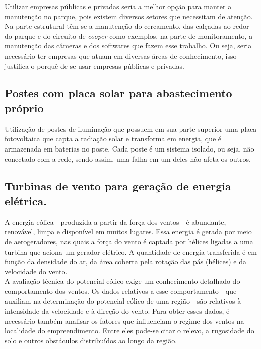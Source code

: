 	Utilizar empresas p\'ublicas e privadas seria a melhor op\c{c}\~ao para manter a manuten\c{c}\~ao no parque, pois existem diversos setores que necessitam de aten\c{c}\~ao. Na parte estrutural t\^em-se a manuten\c{c}\~ao do cercamento, das cal\c{c}adas ao redor do parque e do circuito de \textit{cooper} como exemplos, na parte de monitoramento, a manuten\c{c}\~ao das c\^ameras e dos softwares que fazem esse trabalho. Ou seja, seria necess\'ario ter empresas que atuam em diversas \'areas de conhecimento, isso justifica o porqu\^e de se usar empresas p\'ublicas e privadas.

\subsection{Postes com placa solar para abastecimento pr\'oprio}

Utiliza\c{c}\~ao de postes de ilumina\c{c}\~ao que possuem em sua parte superior uma placa fotovoltaica que capta a radia\c{c}\~ao solar e transforma em energia, que \'e armazenada em baterias no poste. Cada poste \'e um sistema isolado, ou seja, n\~ao conectado com a rede, sendo assim, uma falha em um deles n\~ao afeta os outros.

\subsection{Turbinas de vento para gera\c{c}\~ao de energia el\'etrica.}

A energia e\'olica - produzida a partir da for\c{c}a dos ventos - \'e abundante, renov\'avel, limpa e dispon\'ivel em muitos lugares. Essa energia \'e gerada por meio de aerogeradores, nas quais a for\c{c}a do vento \'e captada por h\'elices ligadas a uma turbina que aciona um gerador el\'etrico. A quantidade de energia transferida \'e em fun\c{c}\~ao da densidade do ar, da \'area coberta pela rota\c{c}\~ao das p\'as (h\'elices) e da velocidade do vento. \\ 

A avalia\c{c}\~ao t\'ecnica do potencial e\'olico exige um conhecimento detalhado do comportamento dos ventos. Os dados relativos a esse comportamento - que auxiliam na determina\c{c}\~ao do potencial e\'olico de uma regi\~ao - s\~ao relativos \`a intensidade da velocidade e \`a dire\c{c}\~ao do vento. Para obter esses dados, \'e necess\'ario tamb\'em analisar os fatores que influenciam o regime dos ventos na localidade do empreendimento. Entre eles pode-se citar o relevo, a rugosidade do solo e outros obst\'aculos distribu\'idos ao longo da regi\~ao. \\ 


